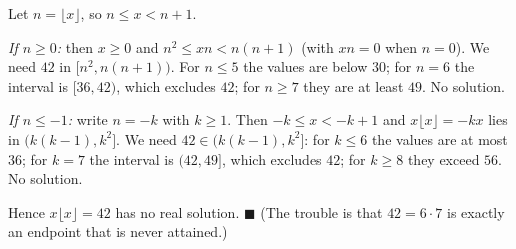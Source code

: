 Let $n=\lfloor x\rfloor$, so $n\le x<n+1$.

\emph{If $n\ge0$:} then $x\ge0$ and $n^2\le x n<n(n+1)$ (with $xn=0$ when $n=0$). We need $42$ in $[n^2,n(n+1))$. For $n\le5$ the values are below $30$; for $n=6$ the interval is $[36,42)$, which excludes $42$; for $n\ge7$ they are at least $49$. No solution.

\emph{If $n\le-1$:} write $n=-k$ with $k\ge1$. Then $-k\le x<-k+1$ and $x\lfloor x\rfloor=-kx$ lies in $(k(k-1),k^2]$. We need $42\in(k(k-1),k^2]$: for $k\le6$ the values are at most $36$; for $k=7$ the interval is $(42,49]$, which excludes $42$; for $k\ge8$ they exceed $56$. No solution.

Hence $x\lfloor x\rfloor=42$ has no real solution. $\blacksquare$ (The trouble is that $42=6\cdot7$ is exactly an endpoint that is never attained.)
